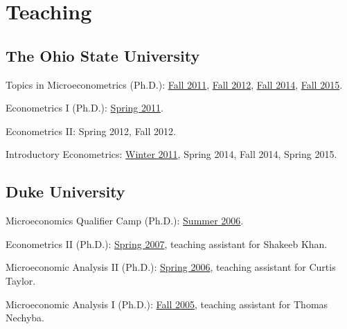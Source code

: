 \documentclass[10pt,letterpaper]{article}
\renewenvironment{itemize}{
  \begin{list}{}{
    \setlength{\leftmargin}{1.5em}
    \setlength{\itemsep}{0.25em}
    \setlength{\parskip}{0pt}
    \setlength{\parsep}{0.25em}
  }
}{
  \end{list}
}
\begin{document}
\section*{Teaching}

\subsection*{The Ohio State University}

\begin{itemize}
\item Topics in Microeconometrics (Ph.D.):
  \href{http://jblevins.org/courses/econ843f11/}{Fall 2011}, %
  \href{http://jblevins.org/courses/econ8833f12/}{Fall 2012}, %
  \href{http://jblevins.org/courses/econ8833f14/}{Fall 2014}, %
  \href{http://jblevins.org/courses/econ8833f15/}{Fall 2015}. %
\item Econometrics I (Ph.D.):
  \href{http://jblevins.org/courses/econ741s11/}{Spring 2011}. %
\item Econometrics II:
  Spring 2012, %
  Fall 2012. %
\item Introductory Econometrics:
  \href{http://jblevins.org/courses/econ444w11/}{Winter 2011}, %
  Spring 2014, %
  Fall 2014, %
  Spring 2015. %
\end{itemize}

\subsection*{Duke University}

\begin{itemize}
\item Microeconomics Qualifier Camp (Ph.D.):
  \href{http://jblevins.org/courses/qualcamp06/}{Summer 2006}.
\item Econometrics II (Ph.D.):
  \href{http://jblevins.org/courses/econ342s07/}{Spring 2007}, teaching assistant for Shakeeb Khan.
\item Microeconomic Analysis II (Ph.D.):
  \href{http://jblevins.org/courses/econ302s06/}{Spring 2006}, teaching assistant for Curtis Taylor.
\item Microeconomic Analysis I (Ph.D.):
  \href{http://jblevins.org/courses/econ301f05/}{Fall 2005}, teaching assistant for Thomas Nechyba.
\end{itemize}
\end{document}
